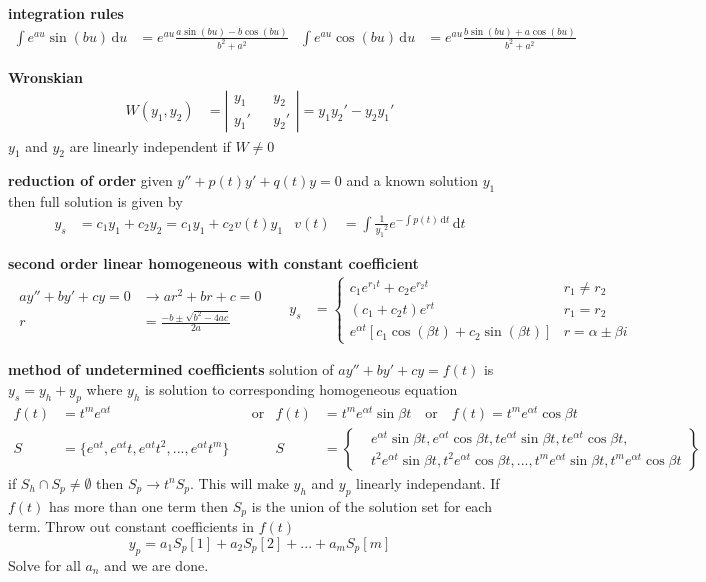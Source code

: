 \documentclass{article}
\newcommand{\abs}[1]{\left\lvert #1 \right\rvert}
\begin{document}
\textbf{integration rules}
\begin{align*}
	\int{e^{au}\sin(bu)\,\mathrm{d}u}&=e^{au}\frac{a\sin(bu)-b\cos(bu)}{b^2+a^2} &
	\int{e^{au}\cos(bu)\,\mathrm{d}u}&=e^{au}\frac{b\sin(bu)+a\cos(bu)}{b^2+a^2}
\end{align*}

\textbf{Wronskian}
\begin{align*}
	W(y_1,y_2)&=\abs{
	\begin{aligned}
	y_1&&y_2\\
	y_1'&&y_2'
	\end{aligned}
	}=y_1y_2'-y_2y_1'
\end{align*}
$y_1$ and $y_2$ are linearly independent if $W\neq0$

\textbf{reduction of order}
given $y''+p(t)y'+q(t)y=0$ and a known solution $y_1$ then full solution is given by
\begin{align*}
	y_s&=c_1y_1+c_2y_2=c_1y_1+c_2v(t)y_1 & v(t)&=\int{\frac{1}{{y_1}^2}e^{-\int{p(t)\,\mathrm{d}t}}\,\mathrm{d}t}
\end{align*}

\textbf{second order linear homogeneous with constant coefficient}
\begin{align*}
\begin{aligned}
	ay''+by'+cy=0&\rightarrow ar^2+br+c=0 \\
	r&=\frac{-b\pm\sqrt{b^2-4ac}}{2a} 
\end{aligned}&&
	y_s&=
	\begin{cases}
		c_1e^{r_1t}+c_2e^{r_2t} & r_1\neq r_2\\
		(c_1+c_2t)e^{rt} & r_1=r_2\\
		e^{\alpha t}\left[c_1\cos(\beta t)+c_2\sin(\beta t)\right] & r=\alpha\pm\beta i
	\end{cases}
\end{align*}

\textbf{method of undetermined coefficients}
solution of $ay''+by'+cy=f(t)$ is $y_s=y_h+y_p$ where $y_h$ is solution to corresponding homogeneous equation
\begin{align*}
	f(t)&=t^me^{\alpha t} &&\text{or}& f(t)&=t^me^{\alpha t}\sin \beta t  \quad\text{or}\quad f(t)=t^me^{\alpha t}\cos \beta t\\
	S&=\{e^{\alpha t},e^{\alpha t}t,e^{\alpha t}t^2,...,e^{\alpha t}t^m\} &&&
	S&=\left\{
	\begin{aligned}
		&e^{\alpha t}\sin\beta t,e^{\alpha t}\cos\beta t,
		te^{\alpha t}\sin\beta t,te^{\alpha t}\cos\beta t,\\
		&t^2e^{\alpha t}\sin\beta t, t^2e^{\alpha t}\cos\beta t,...,
		t^me^{\alpha t}\sin\beta t,t^me^{\alpha t}\cos\beta t
	\end{aligned}
	\right\}
\end{align*}
if $S_h\cap S_p\neq\emptyset$ then $S_p\rightarrow t^nS_p$. This will make $y_h$ and $y_p$ linearly independant. If $f(t)$ has more than one term then $S_p$ is the union of the solution set for each term. Throw out constant coefficients in $f(t)$
\[y_p=a_1S_p[1]+a_2S_p[2]+...+a_mS_p[m]\]
Solve for all $a_n$ and we are done.
\end{document}
